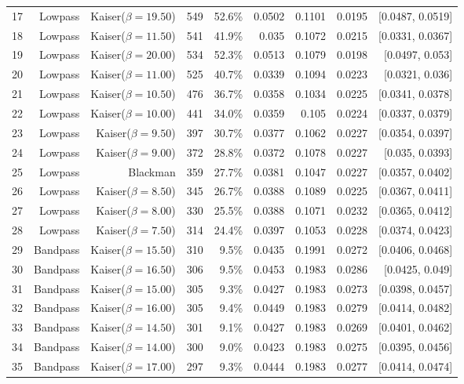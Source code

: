 \begin{longtable}{lrrrrrrrr}
    17 & Lowpass & Kaiser($\beta=19.50$) & 549 & 52.6\% & 0.0502 & 0.1101 & 0.0195 & [0.0487, 0.0519] \\
    18 & Lowpass & Kaiser($\beta=11.50$) & 541 & 41.9\% & 0.035 & 0.1072 & 0.0215 & [0.0331, 0.0367] \\
    19 & Lowpass & Kaiser($\beta=20.00$) & 534 & 52.3\% & 0.0513 & 0.1079 & 0.0198 & [0.0497, 0.053] \\
    20 & Lowpass & Kaiser($\beta=11.00$) & 525 & 40.7\% & 0.0339 & 0.1094 & 0.0223 & [0.0321, 0.036] \\
    21 & Lowpass & Kaiser($\beta=10.50$) & 476 & 36.7\% & 0.0358 & 0.1034 & 0.0225 & [0.0341, 0.0378] \\
    22 & Lowpass & Kaiser($\beta=10.00$) & 441 & 34.0\% & 0.0359 & 0.105 & 0.0224 & [0.0337, 0.0379] \\
    23 & Lowpass & Kaiser($\beta=9.50$) & 397 & 30.7\% & 0.0377 & 0.1062 & 0.0227 & [0.0354, 0.0397] \\
    24 & Lowpass & Kaiser($\beta=9.00$) & 372 & 28.8\% & 0.0372 & 0.1078 & 0.0227 & [0.035, 0.0393] \\
    25 & Lowpass & Blackman & 359 & 27.7\% & 0.0381 & 0.1047 & 0.0227 & [0.0357, 0.0402] \\
    26 & Lowpass & Kaiser($\beta=8.50$) & 345 & 26.7\% & 0.0388 & 0.1089 & 0.0225 & [0.0367, 0.0411] \\
    27 & Lowpass & Kaiser($\beta=8.00$) & 330 & 25.5\% & 0.0388 & 0.1071 & 0.0232 & [0.0365, 0.0412] \\
    28 & Lowpass & Kaiser($\beta=7.50$) & 314 & 24.4\% & 0.0397 & 0.1053 & 0.0228 & [0.0374, 0.0423] \\
    29 & Bandpass & Kaiser($\beta=15.50$) & 310 & 9.5\% & 0.0435 & 0.1991 & 0.0272 & [0.0406, 0.0468] \\
    30 & Bandpass & Kaiser($\beta=16.50$) & 306 & 9.5\% & 0.0453 & 0.1983 & 0.0286 & [0.0425, 0.049] \\
    31 & Bandpass & Kaiser($\beta=15.00$) & 305 & 9.3\% & 0.0427 & 0.1983 & 0.0273 & [0.0398, 0.0457] \\
    32 & Bandpass & Kaiser($\beta=16.00$) & 305 & 9.4\% & 0.0449 & 0.1983 & 0.0279 & [0.0414, 0.0482] \\
    33 & Bandpass & Kaiser($\beta=14.50$) & 301 & 9.1\% & 0.0427 & 0.1983 & 0.0269 & [0.0401, 0.0462] \\
    34 & Bandpass & Kaiser($\beta=14.00$) & 300 & 9.0\% & 0.0423 & 0.1983 & 0.0275 & [0.0395, 0.0456] \\
    35 & Bandpass & Kaiser($\beta=17.00$) & 297 & 9.3\% & 0.0444 & 0.1983 & 0.0277 & [0.0414, 0.0474] \\

\end{longtable}

